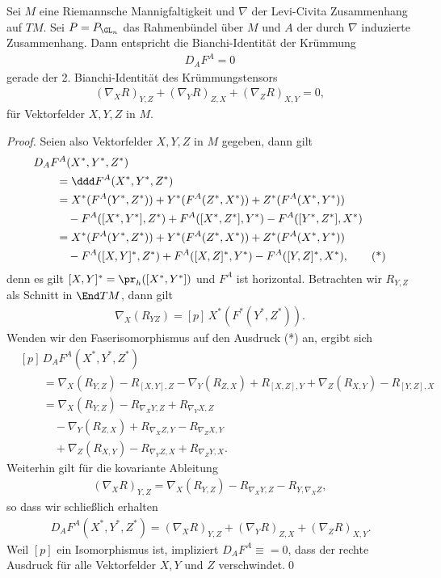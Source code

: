 \documentclass[%
	paper=a5,%
	fleqn,%
	DIV=18,%
	BCOR=0mm,
	fontsize=11pt,
	titlepage=false,%
	bibliography=totoc,
	DIV=18,%
	twoside=true,
	pdftitle=Riemannsche Geometrie,
	pdfauthor=Uwe Semmelmann,
	numbers=noendperiod]%
	{scrbook}
\begin{document}
\begin{lem}
Sei $M$ eine Riemannsche Mannigfaltigkeit und $\nabla$ der Levi-Civita
Zusammenhang auf $TM$. Sei $P=P_{\GL_n}$ das Rahmenbündel über $M$ und $A$ der
durch $\nabla$ induzierte Zusammenhang.
Dann entspricht die Bianchi-Identität der Krümmung
\begin{align*}
D_AF^A = 0
\end{align*}
gerade der 2. Bianchi-Identität des Krümmungstensors
\begin{align*}
(\nabla_X R)_{Y,Z} + 
(\nabla_Y R)_{Z,X}  +
(\nabla_Z R)_{X,Y} = 0,
\end{align*}
für Vektorfelder $X,Y,Z$ in $M$.\fish
\end{lem}
\begin{proof}
Seien also Vektorfelder $X,Y,Z$ in $M$ gegeben, dann gilt
\begin{align*}
&D_A F^A(X^*,Y^*,Z^*)\\
&\qquad= \ddd F^A(X^*,Y^*,Z^*)\\
&\qquad= X^* (F^A(Y^*,Z^*))
+ Y^* (F^A(Z^*,X^*))
+ Z^* (F^A(X^*,Y^*))\\
&\qquad\quad - F^A([X^*,Y^*],Z^*)
+ F^A([X^*,Z^*],Y^*)
- F^A([Y^*,Z^*],X^*)\\
&\qquad= X^* (F^A(Y^*,Z^*))
+ Y^* (F^A(Z^*,X^*))
+ Z^* (F^A(X^*,Y^*))\\
&\qquad\quad - F^A([X,Y]^*,Z^*)
+ F^A([X,Z]^*,Y^*)
- F^A([Y,Z]^*,X^*),\tag{*}
\end{align*}
denn es gilt $[X,Y]^*= \pr_h([X^*,Y^*])$ und  $F^A$ ist horizontal. Betrachten
wir $R_{Y,Z}$ als Schnitt in $\End TM$, dann gilt
\begin{align*}
\nabla_X (R_{YZ}) = [p]\, X^*(F^*(Y^*,Z^*)).
\end{align*} 
Wenden wir den Faserisomorphismus auf den Ausdruck (*) an, ergibt sich
\begin{align*}
&[p]\, D_A F^A(X^*,Y^*,Z^*) \\
&\qquad = 
\nabla_X (R_{Y,Z}) - R_{[X,Y],Z}
- \nabla_Y (R_{Z,X}) + R_{[X,Z],Y}
+ \nabla_Z (R_{X,Y}) - R_{[Y,Z],X}\\
&\qquad = 
\nabla_X (R_{Y,Z}) - R_{\nabla_X Y,Z} + R_{\nabla_Y X,Z}\\
&\qquad\quad - \nabla_Y (R_{Z,X}) + R_{\nabla_X Z,Y} - R_{\nabla_Z X,Y}\\
&\qquad \quad+ \nabla_Z (R_{X,Y}) - R_{\nabla_Y Z,X} + R_{\nabla_Z Y,X}.
\end{align*}
Weiterhin gilt für die kovariante Ableitung
\begin{align*}
(\nabla_X R)_{Y,Z} = \nabla_X (R_{Y,Z}) - R_{\nabla_X Y,Z} - R_{Y,\nabla_X Z},
\end{align*}
so dass wir schließlich erhalten
\begin{align*}
[p]\,D_A F^A(X^*,Y^*,Z^*) = 
(\nabla_X R)_{Y,Z} + (\nabla_Y R)_{Z,X} + (\nabla_Z R)_{X,Y}.
\end{align*}
Weil $[p]$ ein Isomorphismus ist, impliziert $D_A F^A \equiv = 0$, dass der
rechte Ausdruck für alle Vektorfelder $X,Y$ und $Z$ verschwindet.\qed
\end{proof}
\end{document}

